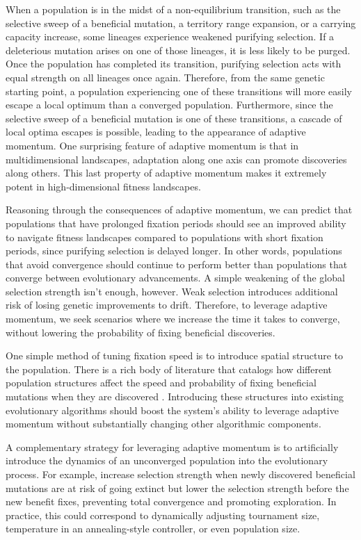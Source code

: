 When a population is in the midst of a non-equilibrium transition, such as the selective sweep of a beneficial mutation, a territory range expansion, or a carrying capacity increase, some lineages experience weakened purifying selection.
If a deleterious mutation arises on one of those lineages, it is less likely to be purged.
Once the population has completed its transition, purifying selection acts with equal strength on all lineages once again.
Therefore, from the same genetic starting point, a population experiencing one of these transitions will more easily escape a local optimum than a converged population.
Furthermore, since the selective sweep of a beneficial mutation is one of these transitions, a cascade of local optima escapes is possible, leading to the appearance of adaptive momentum.
One surprising feature of adaptive momentum is that in multidimensional landscapes, adaptation along one axis can promote discoveries along others.
This last property of adaptive momentum makes it extremely potent in high-dimensional fitness landscapes.

Reasoning through the consequences of adaptive momentum, we can predict that populations that have prolonged fixation periods should see an improved ability to navigate fitness landscapes compared to populations with short fixation periods, since purifying selection is delayed longer.
In other words, populations that avoid convergence should continue to perform better than populations that converge between evolutionary advancements.
A simple weakening of the global selection strength isn't enough, however.
Weak selection introduces additional risk of losing genetic improvements to drift.
Therefore, to leverage adaptive momentum, we seek scenarios where we increase the time it takes to converge, without lowering the probability of fixing beneficial discoveries.

One simple method of tuning fixation speed is to introduce spatial structure to the population.
There is a rich body of literature that catalogs how different population structures affect the speed and probability of fixing beneficial mutations when they are discovered \citep{moller2019exploring,askari2015analytical,lieberman2005evolutionary,bohm2024reduced}.
Introducing these structures into existing evolutionary algorithms should boost the system's ability to leverage adaptive momentum without substantially changing other algorithmic components.

A complementary strategy for leveraging adaptive momentum is to artificially introduce the dynamics of an unconverged population into the evolutionary process.
For example, increase selection strength when newly discovered beneficial mutations are at risk of going extinct but lower the selection strength before the new benefit fixes, preventing total convergence and promoting exploration.
In practice, this could correspond to dynamically adjusting tournament size, temperature in an annealing-style controller, or even population size.

